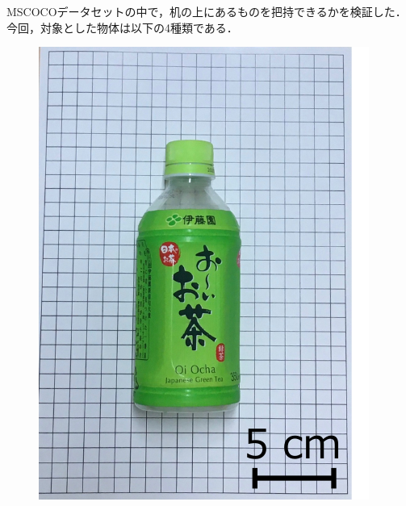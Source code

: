MSCOCOデータセットの中で，机の上にあるものを把持できるかを検証した．
今回，対象とした物体は以下の4種類である．
\begin{figure}[H]
    \centering
    
    \begin{minipage}{0.19\columnwidth}
        \centering
        \includegraphics[clip, width=\linewidth]{figure/chapter4/bottle_350ml}
    \end{minipage}
    \begin{minipage}{0.19\columnwidth}
        \centering

\end{minipage}
\end{figure}
